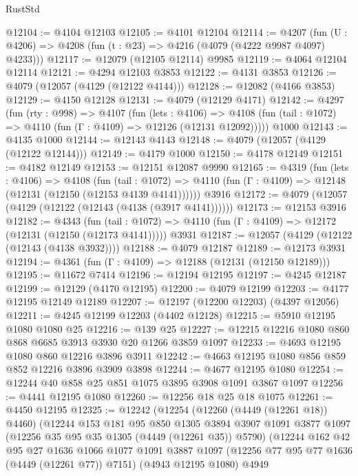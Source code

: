 \begin{lexlean}{RustStd}
\begin{coremodule}
@12104 := @4104 @12103
@12105 := @4101 @12104
@12114 := @4207
    (fun (U : @4206) => @4208 (fun (t : @23) => @4216 (@4079 (@4222 @9987 @4097) @4233)))
@12117 := @12079 (@12105 @12114) @9985
@12119 := @4064 @12104 @12114
@12121 := @4294 @12103 @3853
@12122 := @4131 @3853
@12126 := @4079 (@12057 (@4129 (@12122 @4144)))
@12128 := @12082 (@4166 @3853)
@12129 := @4150 @12128
@12131 := @4079 (@12129 @4171)
@12142 := @4297
    (fun (rty : @998) =>
    @4107
      (fun (lets : @4106) =>
      @4108 (fun (tail : @1072) => @4110 (fun (Γ : @4109) => @12126 (@12131 @12092)))))
    @1000
@12143 := @4135 @1000
@12144 := @12143 @4143
@12148 := @4079 (@12057 (@4129 (@12122 @12144)))
@12149 := @4179 @1000
@12150 := @4178 @12149
@12151 := @4182 @12149
@12153 := @12151 @12087 @9990
@12165 := @4319
    (fun (lets : @4106) =>
    @4108
      (fun (tail : @1072) =>
      @4110 (fun (Γ : @4109) => @12148 (@12131 (@12150 (@12153 @4139 @4141))))))
    @3916
@12172 := @4079 (@12057 (@4129 (@12122 (@12143 (@4138 (@3917 @4141))))))
@12173 := @12153 @3916
@12182 := @4343
    (fun (tail : @1072) => @4110 (fun (Γ : @4109) => @12172 (@12131 (@12150 (@12173 @4141)))))
    @3931
@12187 := @12057 (@4129 (@12122 (@12143 (@4138 @3932))))
@12188 := @4079 @12187
@12189 := @12173 @3931
@12194 := @4361 (fun (Γ : @4109) => @12188 (@12131 (@12150 @12189)))
@12195 := @11672 @7414
@12196 := @12194 @12195
@12197 := @4245 @12187
@12199 := @12129 (@4170 @12195)
@12200 := @4079 @12199
@12203 := @4177 @12195 @12149 @12189
@12207 := @12197 (@12200 @12203) (@4397 @12056)
@12211 := @4245 @12199 @12203 (@4402 @12128)
@12215 := @5910 @12195 @1080 @1080 @25
@12216 := @139 @25
@12227 := @12215 @12216 @1080 @860 @868 @6685 @3913 @3930 @20 @1266 @3859 @1097
@12233 := @4693 @12195 @1080 @860 @12216 @3896 @3911
@12242 := @4663 @12195 @1080 @856 @859 @852 @12216 @3896 @3909 @3898
@12244 := @4677 @12195 @1080
@12254 := @12244 @40 @858 @25 @851 @1075 @3895 @3908 @1091 @3867 @1097
@12256 := @4441 @12195 @1080
@12260 := @12256 @18 @25 @18 @1075
@12261 := @4450 @12195
@12325 := @12242
    (@12254
      (@12260 (@4449 (@12261 @18)) @4460)
      (@12244
        @153
        @181
        @95
        @850
        @1305
        @3894
        @3907
        @1091
        @3877
        @1097
        (@12256 @35 @95 @35 @1305 (@4449 (@12261 @35)) @5790)
        (@12244
          @162
          @42
          @95
          @27
          @1636
          @1066
          @1077
          @1091
          @3887
          @1097
          (@12256 @77 @95 @77 @1636 (@4449 (@12261 @77)) @7151)
          (@4943 @12195 @1080)
          @4949

\end{coremodule}
\end{lexlean}

